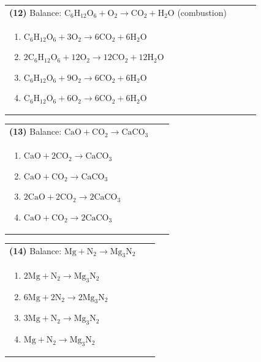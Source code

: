 \documentclass{article}
\begin{document}
{\vspace{0.2cm}
\noindent \begin{tabular}{|p{0.9\linewidth}|}
\hline
\vspace{0.2cm}
\textbf{(12)} Balance: \(\mathrm{C_6H_{12}O_6 + O_2 \rightarrow CO_2 + H_2O}\) (combustion)\\
\begin{minipage}[t]{0.85\linewidth}
\begin{enumerate}[label=\alph*.]
   \item \(\mathrm{C_6H_{12}O_6 + 3O_2 \rightarrow 6CO_2 + 6H_2O}\)
   \item \(\mathrm{2C_6H_{12}O_6 + 12O_2 \rightarrow 12CO_2 + 12H_2O}\)
   \item \(\mathrm{C_6H_{12}O_6 + 9O_2 \rightarrow 6CO_2 + 6H_2O}\)
   \item \(\mathrm{C_6H_{12}O_6 + 6O_2 \rightarrow 6CO_2 + 6H_2O}\)
\end{enumerate}
\end{minipage}\\
\hline
\end{tabular}
\newpage

\vspace{0.2cm}
\noindent \begin{tabular}{|p{0.9\linewidth}|}
\hline
\vspace{0.2cm}
\textbf{(13)} Balance: \(\mathrm{CaO + CO_2 \rightarrow CaCO_3}\)\\
\begin{minipage}[t]{0.85\linewidth}
\begin{enumerate}[label=\alph*.]
   \item \(\mathrm{CaO + 2CO_2 \rightarrow CaCO_3}\)
   \item \(\mathrm{CaO + CO_2 \rightarrow CaCO_3}\)
   \item \(\mathrm{2CaO + 2CO_2 \rightarrow 2CaCO_3}\)
   \item \(\mathrm{CaO + CO_2 \rightarrow 2CaCO_3}\)
\end{enumerate}
\end{minipage}\\
\hline
\end{tabular}

\vspace{0.2cm}
\noindent \begin{tabular}{|p{0.9\linewidth}|}
\hline
\vspace{0.2cm}
\textbf{(14)} Balance: \(\mathrm{Mg + N_2 \rightarrow Mg_3N_2}\)\\
\begin{minipage}[t]{0.85\linewidth}
\begin{enumerate}[label=\alph*.]
   \item \(\mathrm{2Mg + N_2 \rightarrow Mg_3N_2}\)
   \item \(\mathrm{6Mg + 2N_2 \rightarrow 2Mg_3N_2}\)
   \item \(\mathrm{3Mg + N_2 \rightarrow Mg_3N_2}\)
   \item \(\mathrm{Mg + N_2 \rightarrow Mg_3N_2}\)
\end{enumerate}
\end{minipage}\\
\hline
\end{tabular}

}
\end{document}
